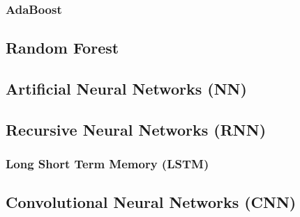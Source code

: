 \subsubsection{AdaBoost}
\label{ml:supervised:BDT:AdaBoost}

\subsection{Random Forest}
\label{ml:supervised:RF}

\subsection{Artificial Neural Networks (NN)}
\label{ml:supervised:ANN}

\subsection{Recursive Neural Networks (RNN)}
\label{ml:supervised:RNN}

\subsubsection{Long Short Term Memory (LSTM)}
\label{ml:supervised:RNN:LSTM}

\subsection{Convolutional Neural Networks (CNN)}
\label{ml:supervised:CNN}
